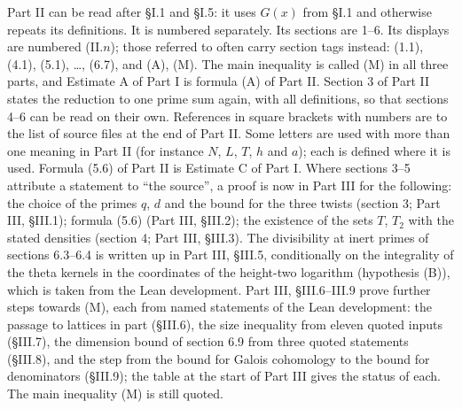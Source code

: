 \documentclass[11pt,letterpaper]{article}
\begin{document}
\noindent Part II can be read after \S I.1 and \S I.5: it uses $G(x)$ from \S I.1 and otherwise repeats its
definitions. It is numbered separately. Its sections are 1--6. Its displays are numbered (II.$n$); those
referred to often carry section tags instead: (1.1), (4.1), (5.1), \dots, (6.7), and (A), (M). The main inequality is called (M) in all three parts, and Estimate A of
Part I is formula (A) of Part II. Section 3 of Part II states the
reduction to one prime sum again, with all definitions, so that sections 4--6 can be read on their own.
References in square brackets with numbers are to the list of source files at the end of Part II. Some letters are
used with more than one meaning in Part II (for instance $N$, $L$, $T$, $h$ and $a$); each is defined where it
is used. Formula (5.6) of Part II is Estimate C of Part I.
Where sections 3--5 attribute a statement to ``the source'', a proof is now in Part III for the following:
the choice of the primes $q$, $d$ and the bound for the three twists (section 3; Part III, \S III.1);
formula (5.6) (Part III, \S III.2); the existence of the sets $T$, $T_2$ with the stated densities
(section 4; Part III, \S III.3). The divisibility at inert primes of sections 6.3--6.4 is written up in Part III, \S III.5, conditionally on the integrality of the theta kernels in the coordinates of the height-two logarithm (hypothesis (B)), which is taken from the Lean development. Part III, \S III.6--III.9 prove further steps towards (M), each from named statements of the Lean development: the passage to lattices in part (\S III.6), the size inequality from eleven quoted inputs (\S III.7), the dimension bound of section 6.9 from three quoted statements (\S III.8), and the step from the bound for Galois cohomology to the bound for denominators (\S III.9); the table at the start of Part III gives the status of each. The main inequality (M) is still quoted.
\end{document}
